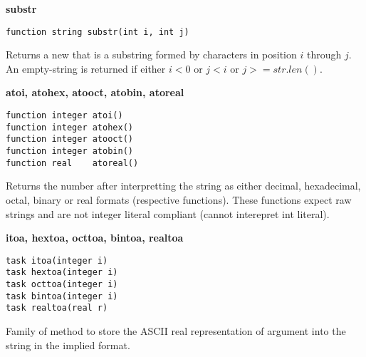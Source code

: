 \begin{description}
\item{{\bf substr}}
\begin{Verbatim}[formatcom=\color{blue}, fillcolor=\color{cyan}]
function string substr(int i, int j)
\end{Verbatim}
Returns a new \kwstring that is a substring formed by characters in
position $i$ through $j$. An empty-string is returned if either $i <
0$ or $j < i$ or $j >= str.len()$.

\item{{\bf atoi, atohex, atooct, atobin, atoreal}}
\begin{Verbatim}[formatcom=\color{blue}, fillcolor=\color{cyan}]
function integer atoi()
function integer atohex()
function integer atooct()
function integer atobin()
function real    atoreal()
\end{Verbatim}
Returns the number after interpretting the string as either decimal,
hexadecimal, octal, binary or real formats (respective
functions). These functions expect raw strings and are not \lvlog
integer literal compliant (cannot interepret \lvlog int literal).

\item{{\bf itoa, hextoa, octtoa, bintoa, realtoa}}
\begin{Verbatim}[formatcom=\color{blue}, fillcolor=\color{cyan}]
task itoa(integer i)
task hextoa(integer i)
task octtoa(integer i)
task bintoa(integer i)
task realtoa(real r)
\end{Verbatim}
Family of method to store the ASCII real representation of argument
into the string in the implied format.

\end{description}

